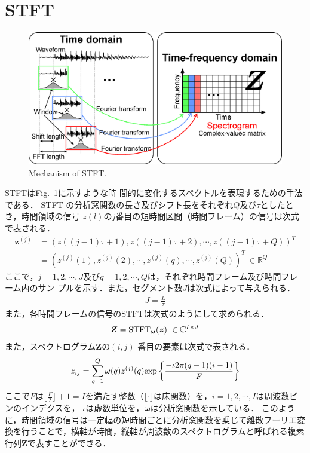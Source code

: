 \section{STFT}
\label{sec:stft}
\begin{figure}[t]
    \begin{center}
        \includegraphics[width=0.95\columnwidth]{figures/stft.eps}
    \end{center}
    \vspace{-8pt}
	\caption{Mechanism of STFT.}
	\label{fig:stft}
\end{figure}
STFTはFig.~\ref{fig:stft}に示すような時
間的に変化するスペクトルを表現するための手法である．
STFT の分析窓関数の長さ及びシフト長をそれぞれ$Q$及び$\tau$としたとき，時間領域の信号
$z(l)$の$j$番目の短時間区間（時間フレーム）の信号は次式で表される．
\begin{align}
    \bm{z}^{(j)} &= \left(z\left((j-1)\tau+1\right), z\left((j-1)\tau+2\right), \cdots , z\left((j-1)\tau+Q\right) \right)^{T}\\
    &= \left(
    z^{(j)}(1),z^{(j)}(2),\cdots , z^{(j)}(q), \cdots , z^{(j)}(Q)
    \right)^{T}~\in \mathbb{R}^{Q}
\end{align}
ここで，$j= 1, 2, \cdots , J$及び$q= 1, 2, \cdots , Q$は，それぞれ時間フレーム及び時間フレーム内のサン
プルを示す．また，セグメント数$J$は次式によって与えられる．
\begin{align}
    J = \frac{L}{\tau}
\end{align}
また，各時間フレームの信号のSTFTは次式のようにして求められる．
\begin{align}
\bm{Z}= {\rm STFT}_{\bm{\omega}}(\bm{z})~\in \mathbb{C}^{I \times J}
\end{align}
また，スペクトログラム$\bm{Z}$の$(i, j)$ 番目の要素は次式で表される．
\begin{align}
    z_{ij}= \sum_{q=1}^{Q}\omega(q)z^{(j)}(q){\rm exp}\left\{\frac{-\iota2\pi(q-1)(i-1)}{F}\right\}
\end{align}
ここで$F$は$\lfloor \frac{F}{2}\rfloor+1 =I$を満たす整数（$\lfloor \cdot \rfloor$は床関数）を，$i= 1, 2, \cdots , I$は周波数ビンのインデクスを，
$\iota$は虚数単位を，$\bm{\omega}$は分析窓関数を示している．
このように，時間領域の信号は一定幅の短時間ごとに分析窓関数を乗じて離散フーリエ変換を行うことで，横軸が時間，縦軸が周波数のスペクトログラムと呼ばれる複素行列$\bm{Z}$で表すことができる．

